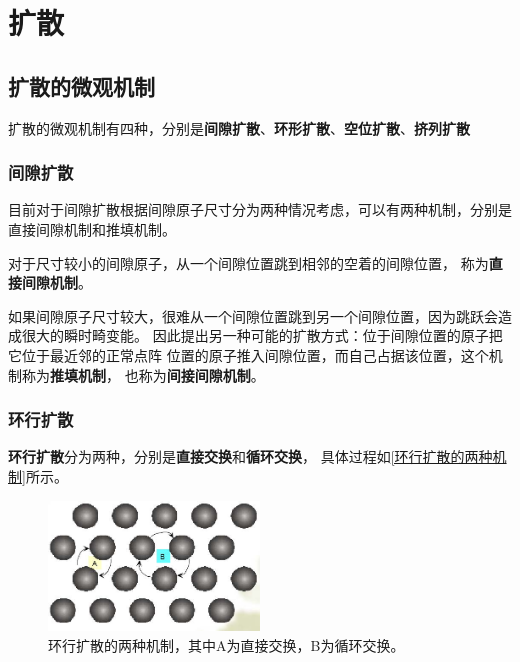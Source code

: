 \chapter{扩散}
    \section{扩散的微观机制}
        扩散的微观机制有四种，分别是\textbf{间隙扩散}、\textbf{环形扩散}、\textbf{空位扩散}、\textbf{挤列扩散}
        \subsection{间隙扩散}
            目前对于间隙扩散根据间隙原子尺寸分为两种情况考虑，可以有两种机制，分别是直接间隙机制和推填机制。

            对于尺寸较小的间隙原子，从一个间隙位置跳到相邻的空着的间隙位置，
            称为\textbf{直接间隙机制}。

            如果间隙原子尺寸较大，很难从一个间隙位置跳到另一个间隙位置，因为跳跃会造成很大的瞬时畸变能。
            因此提出另一种可能的扩散方式：位于间隙位置的原子把它位于最近邻的正常点阵
            位置的原子推入间隙位置，而自己占据该位置，这个机制称为\textbf{推填机制}，
            也称为\textbf{间接间隙机制}。
        \subsection{环行扩散}
            \textbf{环行扩散}分为两种，分别是\textbf{直接交换}和\textbf{循环交换}，
            具体过程如\autoref{环行扩散的两种机制}所示。
            \begin{figure}[ht]
                \centering
                \includegraphics[width=0.5\textwidth]{fig/ring_diffusion.jpg}
                \caption{环行扩散的两种机制，其中A为直接交换，B为循环交换。}
                \label{环行扩散的两种机制}
            \end{figure}
